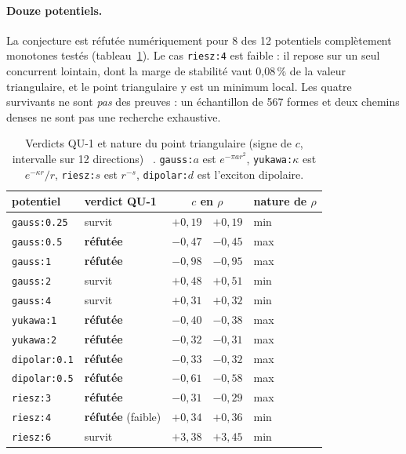 \paragraph{Douze potentiels.} La conjecture est réfutée numériquement pour 8 des 12 potentiels complètement monotones
testés (tableau~\ref{ch3:tab:pot}). Le cas \texttt{riesz:4} est faible : il repose sur un seul concurrent lointain, dont
la marge de stabilité vaut 0,08\,\% de la valeur triangulaire, et le point triangulaire y est un minimum local. Les
quatre survivants ne sont \emph{pas} des preuves : un échantillon de 567 formes et deux chemins denses ne sont pas une
recherche exhaustive.
\begin{table}[ht]\centering\small
\caption{Verdicts QU-1 et nature du point triangulaire (signe de $c$, intervalle sur 12 directions) \tierX~\cite{ch3-p2zp}.
\texttt{gauss:$a$} est $e^{-\pi ar^2}$, \texttt{yukawa:$\kappa$} est $e^{-\kappa r}/r$, \texttt{riesz:$s$} est $r^{-s}$,
\texttt{dipolar:$d$} est l'exciton dipolaire.}\label{ch3:tab:pot}
\begin{tabular}{llr@{\,\ldots\,}ll}\toprule
potentiel & verdict QU-1 & \multicolumn{2}{c}{$c$ en $\rho$} & nature de $\rho$\\\midrule
\texttt{gauss:0.25} & survit & $+0{,}19$ & $+0{,}19$ & min\\
\texttt{gauss:0.5} & \textbf{réfutée} & $-0{,}47$ & $-0{,}45$ & max\\
\texttt{gauss:1} & \textbf{réfutée} & $-0{,}98$ & $-0{,}95$ & max\\
\texttt{gauss:2} & survit & $+0{,}48$ & $+0{,}51$ & min\\
\texttt{gauss:4} & survit & $+0{,}31$ & $+0{,}32$ & min\\
\texttt{yukawa:1} & \textbf{réfutée} & $-0{,}40$ & $-0{,}38$ & max\\
\texttt{yukawa:2} & \textbf{réfutée} & $-0{,}32$ & $-0{,}31$ & max\\
\texttt{dipolar:0.1} & \textbf{réfutée} & $-0{,}33$ & $-0{,}32$ & max\\
\texttt{dipolar:0.5} & \textbf{réfutée} & $-0{,}61$ & $-0{,}58$ & max\\
\texttt{riesz:3} & \textbf{réfutée} & $-0{,}31$ & $-0{,}29$ & max\\
\texttt{riesz:4} & \textbf{réfutée} (faible) & $+0{,}34$ & $+0{,}36$ & min\\
\texttt{riesz:6} & survit & $+3{,}38$ & $+3{,}45$ & min\\
\bottomrule\end{tabular}
\end{table}

